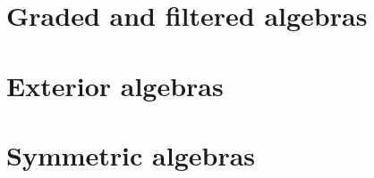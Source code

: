 \documentclass{../../large}
\begin{document}
\section{Graded and filtered algebras}
\section{Exterior algebras}
\begin{prb}[Determinants]
\end{prb}
\section{Symmetric algebras}
\end{document}
